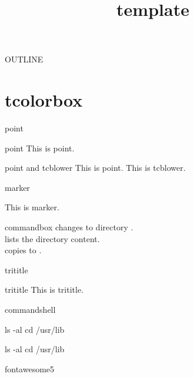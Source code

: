 \documentclass[aspectratio=169]{beamer}
\title{template}
\institute{}
\author{}
\date{\empty}
\begin{document}
    \maketitle

    \begin{frame}{OUTLINE}{}
        \tableofcontents
    \end{frame}

    \section{tcolorbox}

    \begin{frame}{point}{}
        \begin{point}{point}
            This is point.
        \end{point}

        \begin{point}{point and tcblower}
            This is point.
            \tcblower
            This is tcblower.
        \end{point}
    \end{frame}

    \begin{frame}{marker}{}
        \begin{marker}
            This is marker.
        \end{marker}
    \end{frame}

    \begin{frame}[fragile]{commandbox}{}
         changes to directory . \\
         lists the directory content. \\
         copies  to
        .
    \end{frame}

    \begin{frame}{trititle}{}
        \begin{trititle}{trititle}
            This is trititle.
        \end{trititle}
    \end{frame}

    \begin{frame}[fragile]{commandshell}{}
\begin{fullcommandshell}
ls -al
cd /usr/lib
\end{fullcommandshell}
\begin{commandshell}
    ls -al
    cd /usr/lib
\end{commandshell}
    \end{frame}

    \begin{frame}[fragile]{fontawesome5}{}
        \faGithub \\
        \faRust \\
        \faPython \\
    \end{frame}
\end{document}
